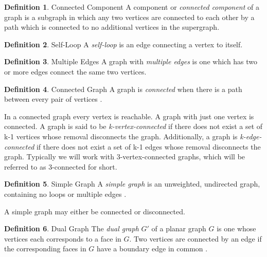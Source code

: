 \documentclass[11pt]{article}
\theoremstyle{definition}
\newtheorem{definition}{Definition}[section]
\begin{document}
	\theoremstyle{definition}
  	\begin{definition}{Connected Component}
		A component or \emph{connected component} of a graph is a subgraph in which any two vertices are connected to each other by a path which is connected to no additional vertices in the supergraph.
	\end{definition}
	
	\theoremstyle{definition}
	\begin{definition}{Self-Loop}
  		A \emph{self-loop} is an edge connecting a vertex to itself.
  	\end{definition}
	
	\theoremstyle{definition}
	\begin{definition}{Multiple Edges}
  		A graph with \emph{multiple edges} is one which has two or more edges connect the same two vertices.
	\end{definition}
	
	\theoremstyle{definition}
	\begin{definition}{Connected Graph}
		A graph is \emph{connected} when there is a path between every pair of vertices \cite{mathworld:ConnectedGraphs}. 
	\end{definition}

	In a connected graph every vertex is reachable. A graph with just one vertex is connected. 
	A graph is said to be \emph{k-vertex-connected} if there does not exist a set of k-1 vertices whose removal disconnects the graph. 
	Additionally, a graph is \emph{k-edge-connected} if there does not exist a set of k-1 edges whose removal disconnects the graph. 
	Typically we will work with 3-vertex-connected graphs, which will be referred to as 3-connected for short.

	\theoremstyle{definition}
	\begin{definition}{Simple Graph}  
  		A \emph{simple graph} is an unweighted, undirected graph, containing no loops or multiple edges \cite{mathworld:SimpleGraphs}. 
	\end{definition}
	
	A simple graph may either be connected or disconnected.
  
  	\theoremstyle{definition}
	\begin{definition}{Dual Graph}
		The \emph{dual graph} $G'$ of a planar graph $G$ is one whose vertices each corresponds to a face in $G$. 
		Two vertices are connected by an edge if the corresponding faces in $G$ have a boundary edge in common \cite{dualGraph}. 
  	\end{definition}
	
\end{document}
